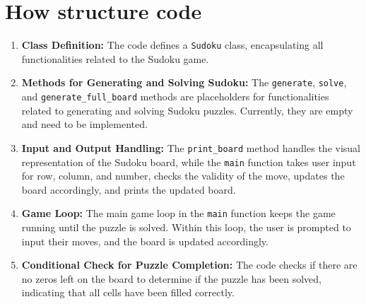 \documentclass{article}
\begin{document}
\section{How structure code}
\begin{enumerate}
    \item \textbf{Class Definition:} The code defines a \texttt{Sudoku} class, encapsulating all functionalities related to the Sudoku game.

    \item \textbf{Methods for Generating and Solving Sudoku:} The \texttt{generate}, \texttt{solve}, and \texttt{generate\_full\_board} methods are placeholders for functionalities related to generating and solving Sudoku puzzles. Currently, they are empty and need to be implemented.

    \item \textbf{Input and Output Handling:} The \texttt{print\_board} method handles the visual representation of the Sudoku board, while the \texttt{main} function takes user input for row, column, and number, checks the validity of the move, updates the board accordingly, and prints the updated board.

    \item \textbf{Game Loop:} The main game loop in the \texttt{main} function keeps the game running until the puzzle is solved. Within this loop, the user is prompted to input their moves, and the board is updated accordingly.

    \item \textbf{Conditional Check for Puzzle Completion:} The code checks if there are no zeros left on the board to determine if the puzzle has been solved, indicating that all cells have been filled correctly.
\end{enumerate}
\end{document}
